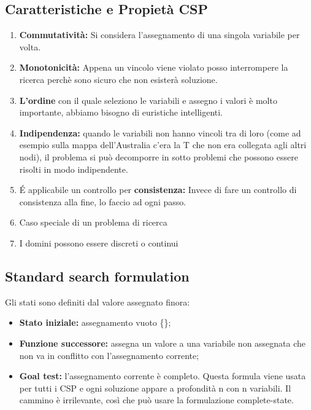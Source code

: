 \subsection{Caratteristiche e Propietà CSP}
\begin{enumerate}
    \item \textbf{Commutatività:} Si considera l’assegnamento di una singola variabile per volta.
    \item \textbf{Monotonicità:} Appena un vincolo viene violato posso interrompere la ricerca perchè sono sicuro che non esisterà soluzione.
    \item \textbf{L’ordine} con il quale seleziono le variabili e assegno i valori è molto importante, abbiamo bisogno di euristiche intelligenti.
    \item \textbf{Indipendenza:} quando le variabili non hanno vincoli tra di loro (come ad esempio sulla mappa dell’Australia c’era la T che non era collegata agli altri nodi), il problema si può decomporre in sotto problemi che possono essere risolti in modo indipendente.
    \item É applicabile un controllo per \textbf{consistenza:} Invece di fare un controllo di consistenza alla fine, lo faccio ad ogni passo.
    \item Caso speciale di un problema di ricerca
    \item I domini possono essere discreti o continui
\end{enumerate}
\subsection{Standard search formulation}
Gli stati sono definiti dal valore assegnato finora:
\begin{itemize}
    \item \textbf{Stato iniziale: }assegnamento vuoto \{\};
    \item \textbf{Funzione successore: }assegna un valore a una variabile non assegnata che non va in conflitto con l’assegnamento corrente;
    \item \textbf{Goal test: }l’assegnamento corrente è completo. Questa formula viene usata per tutti i CSP e ogni soluzione appare a profondità n con n variabili. Il cammino è irrilevante, così che può usare la formulazione complete-state.
\end{itemize}
\newpage
